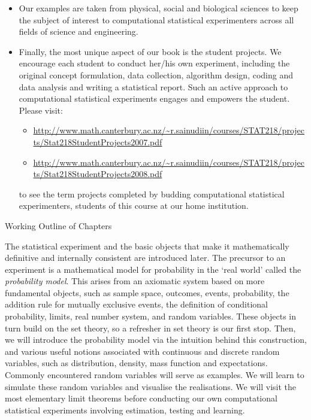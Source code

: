 \documentclass[a4paper]{letter}
\begin{document}
\begin{letter}{}
\begin{itemize}
\begin{itemize}
\item Our examples are taken from physical, social and biological sciences to keep the subject of interest to computational statistical experimenters across all fields of science and engineering.
\item Finally, the most unique aspect of our book is the student projects.  We encourage each student to conduct her/his own experiment, including the original concept formulation, data collection, algorithm design, coding and data analysis and writing a statistical report. Such an active approach to computational statistical experiments engages and empowers the student.  Please visit:
\begin{itemize}
\item
\href{http://www.math.canterbury.ac.nz/~r.sainudiin/courses/STAT218/projects/Stat218StudentProjects2007.pdf}{\url{http://www.math.canterbury.ac.nz/~r.sainudiin/courses/STAT218/projects/Stat218StudentProjects2007.pdf}} \item
\href{http://www.math.canterbury.ac.nz/~r.sainudiin/courses/STAT218/projects/Stat218StudentProjects2008.pdf}{\url{http://www.math.canterbury.ac.nz/~r.sainudiin/courses/STAT218/projects/Stat218StudentProjects2008.pdf}}
\end{itemize}
to see the term projects completed by budding computational statistical experimenters, students of this course at our home institution.
\end{itemize}
\end{itemize}


{Working Outline of Chapters}

The statistical experiment and the basic objects that make it mathematically definitive and internally consistent are introduced later. The precursor to an experiment is a mathematical model for probability in the `real world' called the {\it probability model}.  This arises from an axiomatic system based on more fundamental objects, such as sample space, outcomes, events, probability, the addition rule for mutually exclusive events, the definition of conditional probability, limits, real number system, and random variables.  These objects in turn build on the set theory, so a refresher in set theory is our first stop.  Then, we will introduce the probability model via the intuition behind this construction, and various useful notions associated with continuous and discrete random variables, such as distribution, density, mass function and expectations.  Commonly encountered random variables will serve as examples.  We will learn to simulate these random variables and visualise the realisations.  We will visit the most elementary limit theorems before conducting our own computational statistical experiments involving estimation, testing and learning.


\end{letter}
\end{document}
